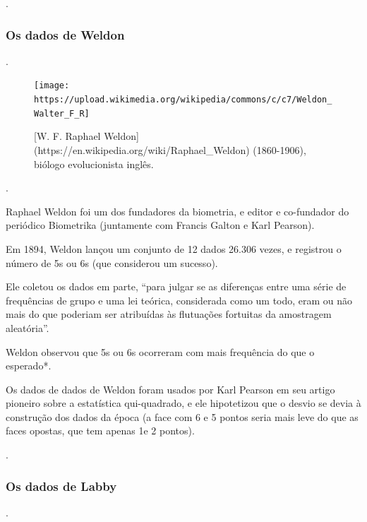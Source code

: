 \documentclass[
]{book}
\begin{document}
.\linebreak

\hypertarget{os-dados-de-weldon}{%
\subsubsection{Os dados de Weldon}\label{os-dados-de-weldon}}

.\linebreak

\begin{figure}

\hfill{}\texttt{[image: https://upload.wikimedia.org/wikipedia/commons/c/c7/Weldon\_Walter\_F\_R]} 

\caption{[W. F. Raphael Weldon](https://en.wikipedia.org/wiki/Raphael_Weldon) (1860-1906), biólogo evolucionista inglês.}\label{fig:weldon}
\end{figure}

.\linebreak

Raphael Weldon foi um dos fundadores da biometria, e editor e co-fundador do periódico Biometrika (juntamente com Francis Galton e Karl Pearson).

Em 1894, Weldon lançou um conjunto de 12 dados 26.306 vezes, e registrou o número de 5s ou 6s (que considerou um sucesso).

Ele coletou os dados em parte, ``para julgar se as diferenças entre uma série de frequências de grupo e uma lei teórica, considerada como um todo, eram ou não mais do que poderiam ser atribuídas às flutuações fortuitas da amostragem aleatória''.

Weldon observou que 5s ou 6s ocorreram com mais frequência do que o esperado*.

Os dados de dados de Weldon foram usados por Karl Pearson em seu artigo pioneiro sobre a estatística qui-quadrado, e ele hipotetizou que o desvio se devia à construção dos dados da época (a face com 6 e 5 pontos seria mais leve do que as faces opostas, que tem apenas 1e 2 pontos).

.\linebreak

\hypertarget{os-dados-de-labby}{%
\subsubsection{Os dados de Labby}\label{os-dados-de-labby}}

.\linebreak
\end{document}
